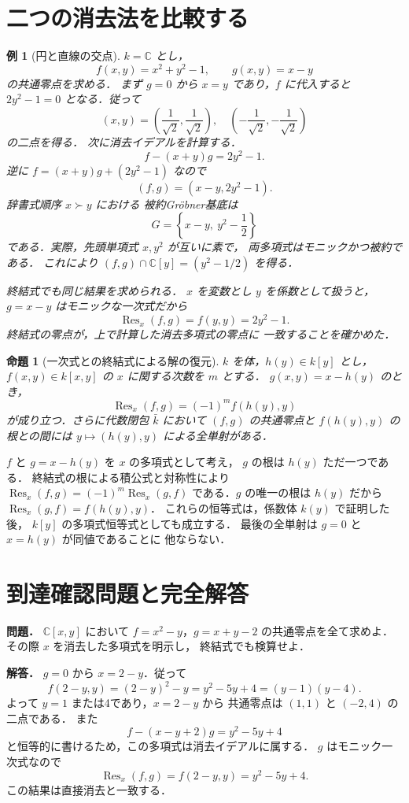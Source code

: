 \documentclass[a5paper,10pt,onecolumn]{jsarticle}
\makeatletter
\theoremstyle{mathnotetheorem}
\newtheorem{proposition}[theorem]{命題}
\newtheorem{example}[theorem]{例}
\renewcommand{\proofname}{証明}
\renewenvironment{proof}[1][\proofname]{%
  \par\pushQED{\qed}\normalfont\topsep4\p@\@plus2\p@\relax
  \trivlist\item[\hskip\labelsep\bfseries #1]\ignorespaces
}{\popQED\endtrivlist\@endpefalse}
\makeatother
\begin{document}
\section{二つの消去法を比較する}
\begin{example}[円と直線の交点]\label{ex:resultant-circle}
$k=\mathbb C$ とし，
\[
 f(x,y)=x^2+y^2-1,\qquad g(x,y)=x-y
\]
の共通零点を求める．
まず $g=0$ から $x=y$ であり，$f$ に代入すると
$2y^2-1=0$ となる．従って
\[
 (x,y)=\left(\frac1{\sqrt2},\frac1{\sqrt2}\right),
 \quad\left(-\frac1{\sqrt2},-\frac1{\sqrt2}\right)
\]
の二点を得る．
次に消去イデアルを計算する．
\[
 f-(x+y)g=2y^2-1.
\]
逆に $f=(x+y)g+(2y^2-1)$ なので
\[
 (f,g)=(x-y,2y^2-1).
\]
辞書式順序 $x\succ y$ における
被約Gr\"obner基底は
\[
 G=\left\{x-y,\ y^2-\frac12\right\}
\]
である．実際，先頭単項式 $x,y^2$ が互いに素で，
両多項式はモニックかつ被約である．
これにより
$(f,g)\cap\mathbb C[y]=(y^2-1/2)$ を得る．

終結式でも同じ結果を求められる．
$x$ を変数とし $y$ を係数として扱うと，
$g=x-y$ はモニックな一次式だから
\[
 \operatorname{Res}_x(f,g)=f(y,y)=2y^2-1.
\]
終結式の零点が，上で計算した消去多項式の零点に
一致することを確かめた．
\end{example}
\begin{proposition}[一次式との終結式による解の復元]
$k$ を体，$h(y)\in k[y]$ とし，
$f(x,y)\in k[x,y]$ の $x$ に関する次数を $m$ とする．
$g(x,y)=x-h(y)$ のとき，
\[
 \operatorname{Res}_x(f,g)=(-1)^m f(h(y),y)
\]
が成り立つ．さらに代数閉包 $\bar k$ において
$(f,g)$ の共通零点と $f(h(y),y)$ の根との間には
$y\longmapsto(h(y),y)$ による全単射がある．
\end{proposition}
\begin{proof}
$f$ と $g=x-h(y)$ を $x$ の多項式として考え，
$g$ の根は $h(y)$ ただ一つである．
終結式の根による積公式と対称性により
$\operatorname{Res}_x(f,g)=(-1)^m\operatorname{Res}_x(g,f)$
である．$g$ の唯一の根は $h(y)$ だから
$\operatorname{Res}_x(g,f)=f(h(y),y)$．
これらの恒等式は，係数体 $k(y)$ で証明した後，
$k[y]$ の多項式恒等式としても成立する．
最後の全単射は $g=0$ と $x=h(y)$ が同値であることに
他ならない．
\end{proof}
\section*{到達確認問題と完全解答}
\noindent\textbf{問題．}
$\mathbb C[x,y]$ において
$f=x^2-y$，$g=x+y-2$ の共通零点を全て求めよ．
その際 $x$ を消去した多項式を明示し，
終結式でも検算せよ．

\medskip\noindent\textbf{解答．}
$g=0$ から $x=2-y$．従って
\[
 f(2-y,y)=(2-y)^2-y
 =y^2-5y+4=(y-1)(y-4).
\]
よって $y=1$ または4であり，$x=2-y$ から
共通零点は $(1,1)$ と $(-2,4)$ の二点である．
また
\[
 f-(x-y+2)g=y^2-5y+4
\]
と恒等的に書けるため，この多項式は消去イデアルに属する．
$g$ はモニック一次式なので
\[
 \operatorname{Res}_x(f,g)=f(2-y,y)=y^2-5y+4.
\]
この結果は直接消去と一致する．
\end{document}
